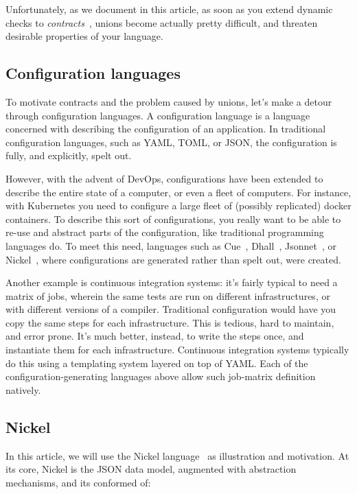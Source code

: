 \documentclass[sigplan,10pt,review,anonymous]{acmart}
\begin{document}
Unfortunately, as we document in this article, as soon as you extend
dynamic checks to \emph{contracts}~\cite{FindlerFelleisenHOContracts},
unions become actually pretty difficult, and threaten desirable
properties of your language.

\subsection{Configuration languages}

To motivate contracts and the problem caused by unions, let's make a
detour through configuration languages.
%
A configuration language is a language concerned with describing the
configuration of an application. In traditional configuration
languages, such as YAML, TOML, or JSON, the configuration is fully,
and explicitly, spelt out.

However, with the advent of DevOps, configurations have been extended
to describe the entire state of a computer, or even a fleet of
computers. For instance, with Kubernetes you need to configure a large
fleet of (possibly replicated) docker containers. To describe this
sort of configurations, you really want to be able to re-use and
abstract parts of the configuration, like traditional programming
languages do. To meet this need, languages such as Cue~\cite{cueLang},
Dhall~\cite{dhallLang}, Jsonnet~\cite{jsonnetLang}, or Nickel~\cite{NickelRepo}, where
configurations are generated rather than spelt out, were created.

Another example is continuous integration systems: it's fairly typical
to need a matrix of jobs, wherein the same tests are run on different
infrastructures, or with different versions of a compiler. Traditional
configuration would have you copy the same steps for each
infrastructure. This is tedious, hard to maintain, and error
prone. It's much better, instead, to write the steps once, and
instantiate them for each infrastructure. Continuous integration
systems typically do this using a templating system layered on top of
YAML. Each of the configuration-generating languages above allow such
job-matrix definition natively.

\subsection{Nickel}

In this article, we will use the Nickel language~\cite{NickelRepo} as
illustration and motivation. At its core, Nickel is the JSON data
model, augmented with abstraction mechanisms, and its conformed of:
\end{document}
